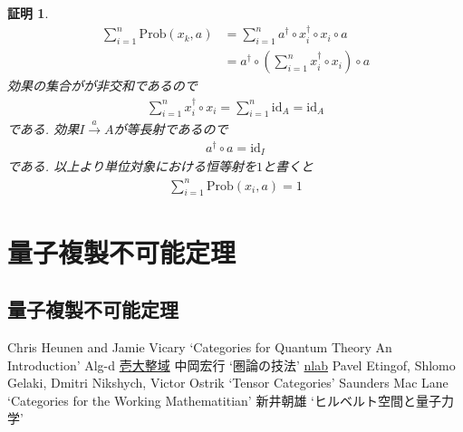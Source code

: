 \documentclass[a4paper,12pt]{ltjsarticle}
\theoremstyle{break}
\newtheorem*{prf}{証明}
\newcommand{\prob}{\mathrm{Prob}}
\newcommand{\xr}[1]{\xrightarrow{#1}}
\newcommand{\id}{\mathrm{id}}
\newcommand{\ci}{\circ}
\newcommand{\da}{\dagger}
\numberwithin{equation}{section}
\begin{document}
\begin{prf}
  \begin{align*}
    \sum_{i=1}^n \prob(x_k,a)
    &= \sum_{i=1}^n a^\da \ci x_i^\da \ci x_i \ci a \\
    &= a^\da \ci \left( \sum_{i=1}^n x_i^\da \ci x_i \right) \ci a
  \end{align*}
  効果の集合がが非交和であるので
  \begin{align*}
    \sum_{i=1}^n x_i^\da \ci x_i
    = \sum_{i=1}^n \id_A
    = \id_A
  \end{align*}
  である. 
  効果$I \xr{a} A$が等長射であるので
  \begin{align*}
    a^\da \ci a = \id_I
  \end{align*}
  である. 
  以上より単位対象における恒等射を$1$と書くと%
  \begin{align*}
    \sum_{i=1}^n \prob(x_i,a)=1
  \end{align*}
\end{prf}

\newpage

\section{量子複製不可能定理}

\subsection{量子複製不可能定理}

\newpage

\begin{thebibliography}{99}
   Chris Heunen and Jamie Vicary `Categories for Quantum Theory An Introduction'
   Alg-d \href{http://alg-d.com/}{壱大整域}
   中岡宏行 `圏論の技法'
   \href{https://ncatlab.org/nlab/show/HomePage}{nlab}
   Pavel Etingof, Shlomo Gelaki, Dmitri Nikshych, Victor Ostrik `Tensor Categories'
   Saunders Mac Lane `Categories for the Working Mathematitian'
   新井朝雄 `ヒルベルト空間と量子力学'
\end{thebibliography}
\end{document}

